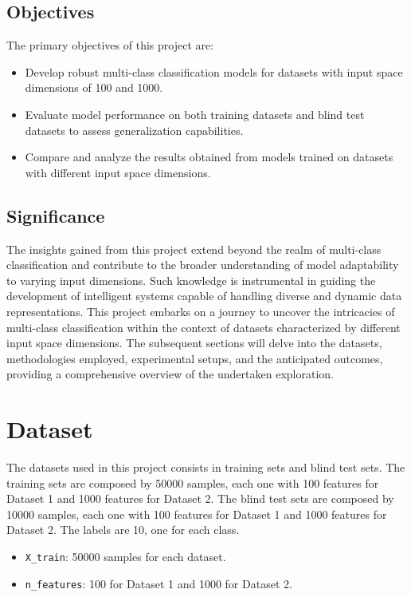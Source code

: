 \documentclass{article}
\begin{document}
\subsection{Objectives}
The primary objectives of this project are:
\begin{itemize}
  \item Develop robust multi-class classification models for datasets with input space dimensions of 100 and 1000.
  \item Evaluate model performance on both training datasets and blind test datasets to assess generalization capabilities.
  \item Compare and analyze the results obtained from models trained on datasets with different input space dimensions.
\end{itemize}

\subsection{Significance}
The insights gained from this project extend beyond the realm of multi-class classification and contribute to the broader understanding of model adaptability to varying input dimensions. Such knowledge is instrumental in guiding the development of intelligent systems capable of handling diverse and dynamic data representations.
\newline
This project embarks on a journey to uncover the intricacies of multi-class classification within the context of datasets characterized by different input space dimensions. The subsequent sections will delve into the datasets, methodologies employed, experimental setups, and the anticipated outcomes, providing a comprehensive overview of the undertaken exploration.

\section{Dataset}

The datasets used in this project consists in training sets and blind test sets. 
The training sets are composed by 50000 samples, each one with 100 features for Dataset 1 and 1000 features for Dataset 2. 
The blind test sets are composed by 10000 samples, each one with 100 features for Dataset 1 and 1000 features for Dataset 2. 
The labels are 10, one for each class.

\begin{itemize}
  \item \texttt{X\_train}: 50000 samples for each dataset.
  \item \texttt{n\_features}: 100 for Dataset 1 and 1000 for Dataset 2.

\end{itemize}
\end{document}

